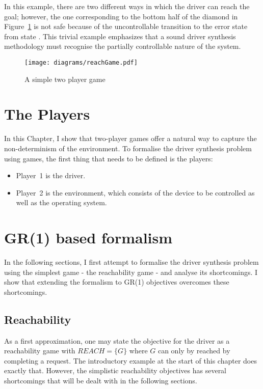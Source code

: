 In this example, there are two different ways in which the driver can reach the goal; however, the one corresponding to the bottom half of the diamond in Figure~\ref{f:game} is not safe because of the uncontrollable transition to the error state from state . This trivial example emphasizes that a sound driver synthesis methodology must recognise the partially controllable nature of the system. 

\begin{figure}
\centering
\texttt{[image: diagrams/reachGame.pdf]}
\caption{A simple two player game}
\label{f:game}
\end{figure}

\section{The Players}
In this Chapter, I show that two-player games offer a natural way to capture the non-determinism of the environment. To formalise the driver synthesis problem using games, the first thing that needs to be defined is the players:

\begin{itemize}
    \item Player~1 is the driver. 
    \item Player~2 is the environment, which consists of the device to be controlled as well as the operating system.
\end{itemize}

\section{GR(1) based formalism}

In the following sections, I first attempt to formalise the driver synthesis problem using the simplest game - the reachability game - and analyse its shortcomings. I show that extending the formalism to GR(1) objectives overcomes these shortcomings.

\subsection{Reachability}

As a first approximation, one may state the objective for the driver as a reachability game with $REACH=\{G\}$ where $G$ can only by reached by completing a request. The introductory example at the start of this chapter does exactly that. However, the simplistic reachability objectives has several shortcomings that will be dealt with in the following sections.

